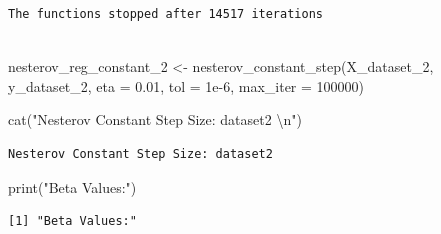 \documentclass[
  letterpaper,
  DIV=11,
  numbers=noendperiod]{scrartcl}
\newenvironment{Shaded}{\begin{snugshade}}{\end{snugshade}}
\newcommand{\AttributeTok}[1]{\textcolor[rgb]{0.40,0.45,0.13}{#1}}
\newcommand{\DecValTok}[1]{\textcolor[rgb]{0.68,0.00,0.00}{#1}}
\newcommand{\FloatTok}[1]{\textcolor[rgb]{0.68,0.00,0.00}{#1}}
\newcommand{\FunctionTok}[1]{\textcolor[rgb]{0.28,0.35,0.67}{#1}}
\newcommand{\NormalTok}[1]{\textcolor[rgb]{0.00,0.23,0.31}{#1}}
\newcommand{\OtherTok}[1]{\textcolor[rgb]{0.00,0.23,0.31}{#1}}
\newcommand{\SpecialCharTok}[1]{\textcolor[rgb]{0.37,0.37,0.37}{#1}}
\newcommand{\StringTok}[1]{\textcolor[rgb]{0.13,0.47,0.30}{#1}}
\begin{document}
\begin{Shaded}
\end{Shaded}

\begin{verbatim}
The functions stopped after 14517 iterations 
 
\end{verbatim}

\begin{Shaded}
\begin{Highlighting}[]
\NormalTok{nesterov\_reg\_constant\_2 }\OtherTok{\textless{}{-}} \FunctionTok{nesterov\_constant\_step}\NormalTok{(X\_dataset\_2, y\_dataset\_2, }\AttributeTok{eta =} \FloatTok{0.01}\NormalTok{, }\AttributeTok{tol =} \FloatTok{1e{-}6}\NormalTok{, }\AttributeTok{max\_iter =} \DecValTok{100000}\NormalTok{)}

\FunctionTok{cat}\NormalTok{(}\StringTok{"Nesterov Constant Step Size: dataset2 }\SpecialCharTok{\textbackslash{}n}\StringTok{"}\NormalTok{)}
\end{Highlighting}
\end{Shaded}

\begin{verbatim}
Nesterov Constant Step Size: dataset2 
\end{verbatim}

\begin{Shaded}
\begin{Highlighting}[]
\FunctionTok{print}\NormalTok{(}\StringTok{"Beta Values:"}\NormalTok{)}
\end{Highlighting}
\end{Shaded}

\begin{verbatim}
[1] "Beta Values:"
\end{verbatim}

\begin{Shaded}
\end{Shaded}
\end{document}
